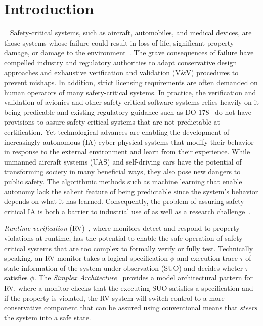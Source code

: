 \section{Introduction}~\label{sec:intro} 
Safety-critical systems, such as aircraft, automobiles, and medical
devices, are those systems whose failure could result
in loss of life, significant property damage, or damage to the
environment~\cite{Knight2002}.  The  grave consequences of failure have compelled
industry and regulatory authorities  to adapt conservative design
approaches and exhaustive verification and validation (V\&V) procedures
to prevent mishaps. In addition, strict licensing requirements are
often demanded on human operators of  many safety-critical systems.
In practice, the verification and validation of avionics
and other safety-critical software systems relies heavily on it being
predicable and existing regulatory guidance  such as
DO-178~\cite{DO178B}  do not  have provisions to
assure safety-critical systems that are not predictable at certification. 
Yet technological advances are enabling the development of increasingly
autonomous (IA) cyber-physical  systems that modify their behavior in response
to the external environment and learn from their experience.  While
unmanned aircraft systems (UAS) and self-driving cars have the
potential of transforming society in many beneficial ways, they also
pose new dangers to public safety. The algorithmic methods such as
machine learning that enable autonomy lack the salient feature of
being predictable since the system's behavior depends on what it has
learned.  Consequently, the  problem  of assuring safety-critical IA is
both a barrier to industrial use of  as well as a research challenge~\cite{NRC14}.


\emph{Runtime verification} (RV)~\cite{monitors}, where monitors
detect and respond to property violations at runtime, has the
potential to enable the safe operation of safety-critical systems that
are too complex to formally verify or fully test.  Technically
speaking, an RV monitor takes a logical specification $\phi$ and
execution trace $\tau$ of state information of the system under
observation (SUO) and decides wheter $\tau$ satisfies $\phi$. The
\emph{Simplex Architecture}~\cite{simplex} provides a model
architectural pattern for RV, where a monitor checks that the
executing SUO satisfies a specification and if the property is
violated, the RV system will switch control to a more conservative
component that can be assured using conventional means that
\emph{steers} the system into a safe state.

